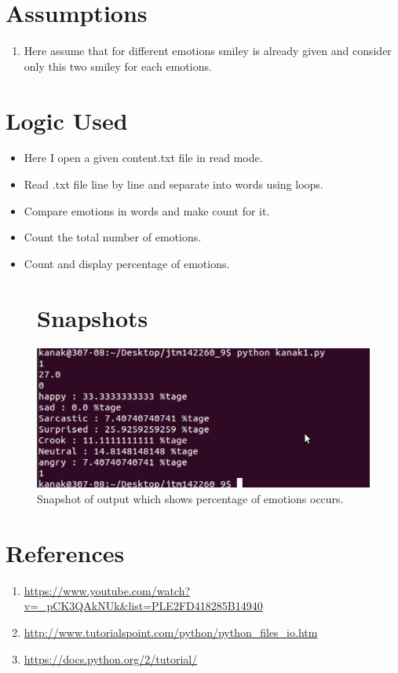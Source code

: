 \documentclass[a4paper,10pt]{report}
\begin{document}
 \section{Assumptions}
\begin{enumerate}
\item Here assume that for different emotions smiley is already given and consider only this two smiley for each emotions.
\end{enumerate}
 \section{Logic Used}
 \begin{itemize}
  \item Here I open a given content.txt file in read mode.
  \item Read .txt file line by line and separate into words using loops.
  \item Compare emotions in words and make count for it.
  \item Count the total number of emotions.
  \item Count and display percentage of emotions.
 \end{itemize}
 
 \newpage
 \begin{figure}
  


\section{Snapshots}
 
 \begin{center}
 \includegraphics[bb=0 0 547 242,scale=0.9]{./kanak2.png}
 \caption{Snapshot of output which shows percentage of emotions occurs.}
\end{center}
 \end{figure}
 
 \newpage
\section{References}
 \begin{enumerate} 
\item\url{ https://www.youtube.com/watch?v=_pCK3QAkNUk&list=PLE2FD418285B14940}
\item\url{http://www.tutorialspoint.com/python/python_files_io.htm}
\item\url{https://docs.python.org/2/tutorial/}
 \end{enumerate}

 
 
\end{document}
